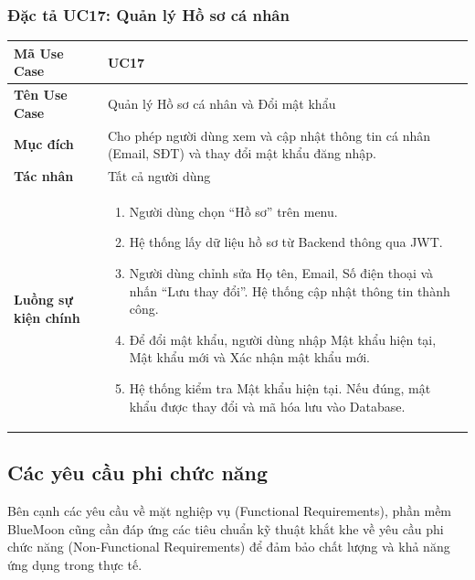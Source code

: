 \documentclass[12pt,a4paper]{article}
\begin{document}
\subsubsection{Đặc tả UC17: Quản lý Hồ sơ cá nhân}
\begin{table}[H]
    \centering
    \renewcommand{\arraystretch}{1.2}
    \begin{tabularx}{\textwidth}{|l|X|}
    \hline
    \textbf{Mã Use Case} & \textbf{UC17} \\
    \hline
    \textbf{Tên Use Case} & Quản lý Hồ sơ cá nhân và Đổi mật khẩu \\
    \hline
    \textbf{Mục đích} & Cho phép người dùng xem và cập nhật thông tin cá nhân (Email, SĐT) và thay đổi mật khẩu đăng nhập. \\
    \hline
    \textbf{Tác nhân} & Tất cả người dùng \\
    \hline
    \textbf{Luồng sự kiện chính} &
    \begin{enumerate}
        \item Người dùng chọn ``Hồ sơ'' trên menu.
        \item Hệ thống lấy dữ liệu hồ sơ từ Backend thông qua JWT.
        \item Người dùng chỉnh sửa Họ tên, Email, Số điện thoại và nhấn ``Lưu thay đổi''. Hệ thống cập nhật thông tin thành công.
        \item Để đổi mật khẩu, người dùng nhập Mật khẩu hiện tại, Mật khẩu mới và Xác nhận mật khẩu mới.
        \item Hệ thống kiểm tra Mật khẩu hiện tại. Nếu đúng, mật khẩu được thay đổi và mã hóa lưu vào Database.
    \end{enumerate} \\
    \hline
    \end{tabularx}
\end{table}

\subsection{Các yêu cầu phi chức năng}

Bên cạnh các yêu cầu về mặt nghiệp vụ (Functional Requirements), phần mềm BlueMoon cũng cần đáp ứng các tiêu chuẩn kỹ thuật khắt khe về yêu cầu phi chức năng (Non-Functional Requirements) để đảm bảo chất lượng và khả năng ứng dụng trong thực tế.
\end{document}
